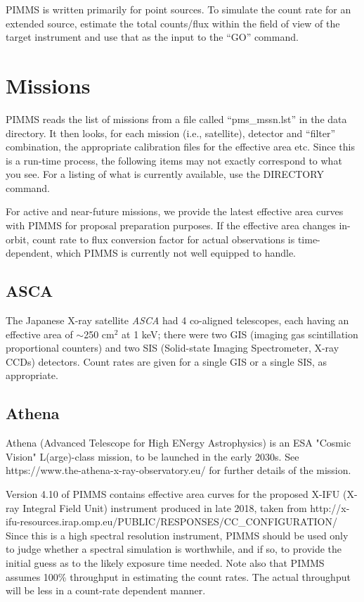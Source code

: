 \documentclass[11pt]{article}
\begin{document}
PIMMS is written primarily for point sources.  To simulate the count
rate for an extended source, estimate the total counts/flux within the
field of view of the target instrument and use that as the input to
the ``GO'' command.

\section{Missions}

PIMMS reads the list of missions from a file called ``pms\_mssn.lst'' in the
data directory.     It then looks, for each mission (i.e., satellite),
detector and ``filter'' combination, the  appropriate calibration files for the
effective area etc.   Since this is a run-time process, the following items
may not exactly correspond to what you see.   For a listing of what is
currently available, use the DIRECTORY command.

For active and near-future missions, we provide the latest effective area
curves with PIMMS for proposal preparation purposes.  If the effective area
changes in-orbit, count rate to flux conversion factor for actual observations
is time-dependent, which PIMMS is currently not well equipped to handle.

\subsection{ASCA}

The Japanese X-ray satellite {\em ASCA\/} had 4 co-aligned telescopes,
each having an effective area  of $\sim$250 cm$^2$ at 1 keV; there were
two GIS (imaging gas scintillation proportional counters) and two SIS
(Solid-state Imaging Spectrometer, X-ray CCDs) detectors.  Count rates
are given for a single GIS or a single SIS, as appropriate.

\subsection{Athena}
Athena (Advanced Telescope for High ENergy Astrophysics) is an ESA "Cosmic
Vision" L(arge)-class mission, to be launched in the early 2030s. See
 https://www.the-athena-x-ray-observatory.eu/ for further details of the
mission.

Version 4.10 of PIMMS contains effective area curves for the proposed X-IFU
(X-ray Integral Field Unit) instrument produced in late 2018, taken from
 http://x-ifu-resources.irap.omp.eu/PUBLIC/RESPONSES/CC\_CONFIGURATION/
Since this is a high spectral resolution instrument, PIMMS should be used
only to judge whether a spectral simulation is worthwhile, and if so, to
provide the initial guess as to the likely exposure time needed. Note also
that PIMMS assumes 100\% throughput in estimating the count rates. The actual
throughput will be less in a count-rate dependent manner.
\end{document}
